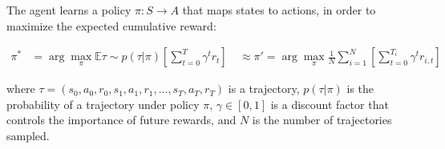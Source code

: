 The agent learns a policy $\pi: S \to A$ that maps states to actions, in order to maximize the expected cumulative reward:

\begin{equation}
    \label{rl_objective}
    \begin{aligned}
    \pi^* &= \arg\max_{\pi} \mathbb{E}{\tau \sim p(\tau | \pi)} \left[ \sum_{t=0}^T \gamma^t r_t \right] \
    &\approx \pi' = \arg\max_{\pi} \frac{1}{N} \sum_{i=1}^N \left[ \sum_{t=0}^{T_i} \gamma^t r_{i,t} \right]
    \end{aligned}
\end{equation}

where $\tau = (s_0, a_0, r_0, s_1, a_1, r_1, \ldots, s_T, a_T, r_T)$ is a trajectory, $p(\tau | \pi)$ is the probability of a trajectory 
under policy $\pi$, $\gamma \in [0,1]$ is a discount factor that controls the importance of future rewards, and $N$ is the number of trajectories sampled.

